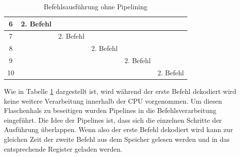 \documentclass[12pt]{article}
\begin{document}
\begin{table}[!htb]
\begin{tabular}{|c|l|l|l|l|l|}
6    & 2. Befehl                                                                        &                                 &                                                                                 &                                &                                                                                            \\ \hline
7    &                                                                                  & 2. Befehl                       &                                                                                 &                                &                                                                                            \\ \hline
8    &                                                                                  &                                 & 2. Befehl                                                                       &                                &                                                                                            \\ \hline
9    &                                                                                  &                                 &                                                                                 & 2. Befehl                      &                                                                                            \\ \hline
10   &                                                                                  &                                 &                                                                                 &                                & 2. Befehl                                                                                  \\ \hline


\end{tabular}
\caption{Befehlsausführung ohne Pipelining \protect\cite{mikroprozessortechnik2011}}
\label{noPipeline}
\end{table}

\par\bigskip\noindent Wie in Tabelle \ref{noPipeline} dargestellt ist, wird während der erste Befehl dekodiert wird keine weitere Verarbeitung innerhalb der CPU vorgenommen. Um diesen Flaschenhals zu beseitigen wurden Pipelines in die Befehlsverarbeitung eingeführt. Die Idee der Pipelines ist, dass sich die einzelnen Schritte der Ausführung überlappen. Wenn also der erste Befehl dekodiert wird kann zur gleichen Zeit der zweite Befehl aus dem Speicher gelesen werden und in das entsprechende Register geladen werden.
\end{document}

